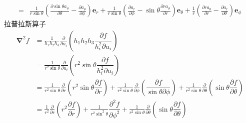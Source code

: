 \begin{align}
    =&\frac{1}{r\sin\theta}\left(\frac{\partial\sin\theta  a_{\phi}}{\partial \theta}
    -\frac{\partial a_\theta}{\partial \phi}\right)\boldsymbol{e}_r
    +\frac{1}{r\sin\theta }\left(\frac{\partial a_r}{\partial \phi}
    -\sin\theta\frac{\partial r a_{\phi}}{\partial r}
    \right)\boldsymbol{e}_\theta
    +\frac{1}{r}\left(\frac{\partial ra_\theta}{\partial r}
    -\frac{\partial a_r}{\partial \theta}\right)\boldsymbol{e}_\phi
\end{align}
拉普拉斯算子
\begin{align}
    \boldsymbol{\nabla}^2{f}&=\frac{1}{h_1 h_2 h_3}\frac{\partial}{\partial u_i}\left(h_1 h_2 h_3\dfrac{{\partial f}}{h_i^2\partial u_i}\right)\nonumber\\
    &=\frac{1}{r^2\sin\theta}\frac{\partial}{\partial u_i}\left(r^2\sin\theta\dfrac{{\partial f}}{h_i^2\partial u_i}\right)\nonumber\\
    &=\frac{1}{r^2\sin\theta}\frac{\partial}{\partial r}\left(r^2\sin\theta\dfrac{{\partial f}}{\partial r}\right)
    +\frac{1}{r^2\sin\theta}\frac{\partial}{\partial \phi}\left(\dfrac{{\partial f}}{\sin\theta\partial \phi}\right)
    +\frac{1}{r^2\sin\theta}\frac{\partial}{\partial \theta}\left(\sin\theta\dfrac{{\partial f}}{\partial \theta}\right)\nonumber\\
    &=\frac{1}{r^2}\frac{\partial}{\partial r}\left(r^2\dfrac{{\partial f}}{\partial r}\right)
    +\frac{1}{r^2\sin^2\theta}\dfrac{{\partial^2 f}}{\partial \phi^2}
    +\frac{1}{r^2\sin\theta}\frac{\partial}{\partial \theta}\left(\sin\theta\dfrac{{\partial f}}{\partial \theta}\right)
\end{align}

